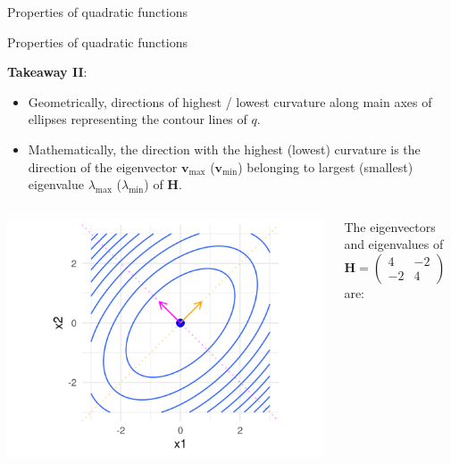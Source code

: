 \documentclass[11pt,compress,t,notes=noshow, xcolor=table]{beamer}
\begin{document}
\begin{frame}{Properties of quadratic functions}
{  }
  
  \end{frame}
  
  
  \begin{frame}{Properties of quadratic functions}
  
  \textbf{Takeaway II}:
  
  \begin{itemize}
    \item Geometrically, directions of highest / lowest curvature along main axes of ellipses representing the contour lines of $q$. 
    \item Mathematically, the direction with the highest (lowest) curvature is the direction of the eigenvector $\bm{v}_\text{max}$ ($\bm{v}_\text{min}$) belonging to largest (smallest) eigenvalue $\lambda_\text{max}$ ($\lambda_\text{min}$) of $\bm{H}$. 
  \end{itemize}
  
  \begin{columns}
  
  \begin{column}{0.5\textwidth}  
      \begin{center}
        \includegraphics{figure_man/quadratic_functions_2D_example_1_7.png}      
       \end{center}
  \end{column}
  
  \begin{column}{0.5\textwidth}
  
  \begin{footnotesize}
   The eigenvectors and eigenvalues of $\bm{H} = \begin{pmatrix} 4 & -2 \\ -2 & 4\end{pmatrix}$ are: 
  

\end{footnotesize}
\end{column}
\end{columns}
\end{frame}
\end{document}
